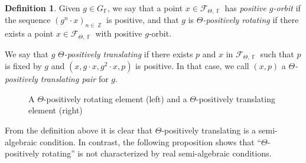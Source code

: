\documentclass{amsart}
\theoremstyle{plain}
\theoremstyle{definition}
\newtheorem{definition}[proposition]{Definition}
\DeclareMathOperator{\Fb}{{\mathbb{F}}}
\DeclareMathOperator{\Zb}{\mathbb{Z}}
\newcommand{\1}{\mathbf{1}}
\begin{document}
\begin{definition}
\label{dfn:PosRotPosTransl}
    Given $g\in G_{\Fb}$, we say that a point $x\in \mathcal F_{\Theta,\Fb}$ has \emph{positive $g$-orbit} if the sequence $(g^n\cdot x)_{n\in \Zb}$ is positive, and that $g$ is \emph{$\Theta$-positively rotating} if there exists a point $x\in \mathcal F_{\Theta,\Fb}$ with positive $g$-orbit.
    
    We say that $g$ \emph{$\Theta$-positively translating} if there exists $p$ and $x$ in $\mathcal F_{\Theta,\Fb}$ such that $p$ is fixed by $g$ and $(x,g\cdot x, g^2\cdot x, p)$ is positive. In that case, we call $(x,p)$ a \emph{$\Theta$-positively translating pair} for $g$.
\end{definition}

\begin{figure}[ht]
    \centering
    \caption{A $\Theta$-positively rotating element (left) and a $\Theta$-positively translating element (right)}
\end{figure}

From the definition above it is clear that $\Theta$-positively translating is a semi-algebraic condition. In contrast, the following proposition shows that ``$\Theta$-positively rotating'' is not characterized by real semi-algebraic conditions.
\end{document}

